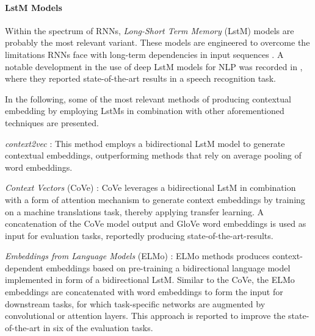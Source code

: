 \documentclass[11pt, numbers=noenddot]{scrreprt}
\let\citef\cite  %
\let\cite\parencite  %
\begin{document}

\paragraph{L\gls{st}M Models}
Within the spectrum of RNNs, \textit{Long-Short Term Memory} (L\gls{st}M) models are probably the most relevant variant. These models are engineered to overcome the limitations RNNs face with long-term dependencies in input sequences \cite{hochreiterLongShortTermMemory1997, yuReviewRecurrentNeural2019}. A notable development in the use of deep L\gls{st}M models for NLP was recorded in \citef{gravesSpeechRecognitionDeep2013}, where they reported state-of-the-art results in a speech recognition task.


In the following, some of the most relevant methods of producing contextual embedding by employing
L\gls{st}Ms in combination with other aforementioned techniques are presented.

\textit{context2vec} \cite{melamudContext2vecLearningGeneric2016}: This method employs a bidirectional L\gls{st}M model to generate contextual embeddings, outperforming methods that rely on average pooling of word embeddings.

\textit{Context Vectors} (CoVe) \cite{mccannLearnedTranslationContextualized2018}: CoVe leverages a bidirectional L\gls{st}M in combination with a form of attention mechanism to generate context embeddings by training on a machine translations task, thereby applying transfer learning. A concatenation of the CoVe model output and GloVe word embeddings is used as input for evaluation tasks, reportedly producing state-of-the-art-results.

\textit{Embeddings from Language Models} (ELMo) \cite{petersDeepContextualizedWord2018}: ELMo methods produces context-dependent embeddings based on pre-training a bidirectional language model implemented in form of a bidirectional L\gls{st}M. Similar to the CoVe, the ELMo embeddings are concatenated with word embeddings to form the input for downstream tasks, for which task-specific networks are augmented by convolutional or attention layers. This approach is reported to improve the state-of-the-art in six of the evaluation tasks.

\end{document}
